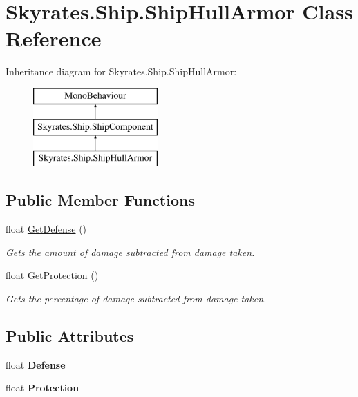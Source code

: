 \hypertarget{class_skyrates_1_1_ship_1_1_ship_hull_armor}{\section{Skyrates.\-Ship.\-Ship\-Hull\-Armor Class Reference}
\label{class_skyrates_1_1_ship_1_1_ship_hull_armor}
}
Inheritance diagram for Skyrates.\-Ship.\-Ship\-Hull\-Armor\-:\begin{figure}[H]
\begin{center}
\leavevmode
\includegraphics[height=3.000000cm]{class_skyrates_1_1_ship_1_1_ship_hull_armor}
\end{center}
\end{figure}
\subsection*{Public Member Functions}
\begin{DoxyCompactItemize}
\item 
float \hyperlink{class_skyrates_1_1_ship_1_1_ship_hull_armor_a820209a9d8d83edf172f154fce84dc23}{Get\-Defense} ()
\begin{DoxyCompactList}\small\item\em Gets the amount of damage subtracted from damage taken. \end{DoxyCompactList}\item 
float \hyperlink{class_skyrates_1_1_ship_1_1_ship_hull_armor_a2f94314c8883d871959ae9363c60bf6d}{Get\-Protection} ()
\begin{DoxyCompactList}\small\item\em Gets the percentage of damage subtracted from damage taken. \end{DoxyCompactList}\end{DoxyCompactItemize}
\subsection*{Public Attributes}
\begin{DoxyCompactItemize}
\item 
\hypertarget{class_skyrates_1_1_ship_1_1_ship_hull_armor_a759a6afd531db5eb548d9bda7ee4e863}{float {\bfseries Defense}}\label{class_skyrates_1_1_ship_1_1_ship_hull_armor_a759a6afd531db5eb548d9bda7ee4e863}

\item 
\hypertarget{class_skyrates_1_1_ship_1_1_ship_hull_armor_adc816a1b628b6d8fc689d2d18e5adb92}{float {\bfseries Protection}}\label{class_skyrates_1_1_ship_1_1_ship_hull_armor_adc816a1b628b6d8fc689d2d18e5adb92}

\end{DoxyCompactItemize}


